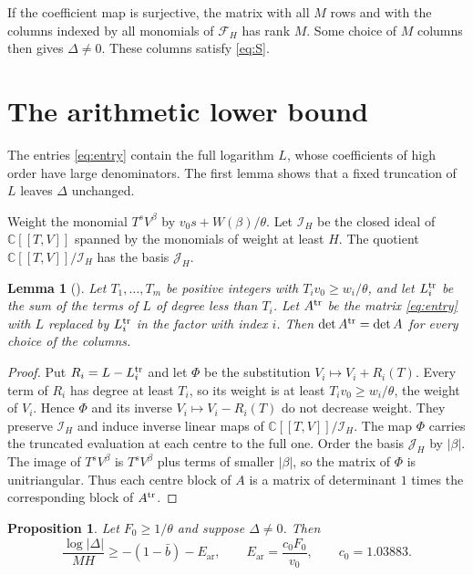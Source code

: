 \documentclass[11pt]{amsart}
\newtheorem{lemma}[theorem]{Lemma}
\newtheorem{proposition}[theorem]{Proposition}
\theoremstyle{definition}
\theoremstyle{remark}
\numberwithin{equation}{section}
\newcommand{\C}{\mathbb C}
\newcommand{\Ear}{E_{\mathrm{ar}}}
\newcommand{\cJ}{\mathcal J}
\newcommand{\cF}{\mathcal F}
\newcommand{\fa}{\mathcal I}
\newcommand{\bb}{\bar b}
\begin{document}
If the coefficient map is surjective, the matrix with all $M$ rows and with the columns indexed by all
monomials of $\cF_H$ has rank $M$. Some choice of $M$ columns then gives $\Delta\ne0$. These columns satisfy
\eqref{eq:S}.

\section{The arithmetic lower bound}\label{sec:arith}

The entries \eqref{eq:entry} contain the full logarithm $L$, whose coefficients of high order have large
denominators. The first lemma shows that a fixed truncation of $L$ leaves $\Delta$ unchanged.

Weight the monomial $T^sV^\beta$ by $v_0s+W(\beta)/\theta$. Let $\fa_H$ be the closed ideal of $\C[[T,V]]$
spanned by the monomials of weight at least $H$. The quotient $\C[[T,V]]/\fa_H$ has the basis $\cJ_H$.

\begin{lemma}[{\cite[Lemma~15.1]{ChudnovskyChudnovsky26}}]\label{lem:trunc}
Let $T_1,\dots,T_m$ be positive integers with $T_iv_0\ge w_i/\theta$, and let $L_i^{\rm tr}$ be the sum of the
terms of $L$ of degree less than $T_i$. Let $A^{\rm tr}$ be the matrix \eqref{eq:entry} with $L$ replaced by
$L_i^{\rm tr}$ in the factor with index $i$. Then $\det A^{\rm tr}=\det A$ for every choice of the columns.
\end{lemma}

\begin{proof}
Put $R_i=L-L_i^{\rm tr}$ and let $\Phi$ be the substitution $V_i\mapsto V_i+R_i(T)$. Every term of $R_i$ has
degree at least $T_i$, so its weight is at least $T_iv_0\ge w_i/\theta$, the weight of $V_i$. Hence $\Phi$ and
its inverse $V_i\mapsto V_i-R_i(T)$ do not decrease weight. They preserve $\fa_H$ and induce inverse linear maps
of $\C[[T,V]]/\fa_H$. The map $\Phi$ carries the truncated evaluation at each centre to the full one. Order the
basis $\cJ_H$ by $|\beta|$. The image of $T^sV^\beta$ is $T^sV^\beta$ plus terms of smaller $|\beta|$, so the
matrix of $\Phi$ is unitriangular. Thus each centre block of $A$ is a matrix of determinant $1$ times the
corresponding block of $A^{\rm tr}$.
\end{proof}

\begin{proposition}\label{prop:arith}
Let $F_0\ge1/\theta$ and suppose $\Delta\ne0$. Then
\[
 \frac{\log|\Delta|}{MH}\ge-(1-\bb)-\Ear,\qquad \Ear=\frac{c_0F_0}{v_0},\qquad c_0=1.03883.
\]
\end{proposition}
\end{document}
